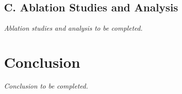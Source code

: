 \documentclass{article}
\begin{document}
\subsection{C. Ablation Studies and Analysis}
\textit{Ablation studies and analysis to be completed.}

\section{Conclusion}
\textit{Conclusion to be completed.}

% 
% 
\end{document}
